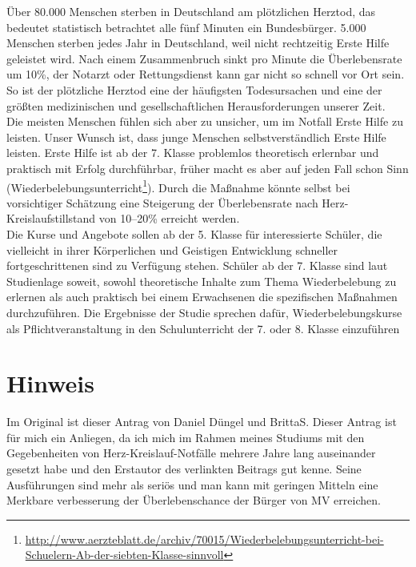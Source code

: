 Über 80.000 Menschen sterben in Deutschland am plötzlichen Herztod, das bedeutet statistisch betrachtet alle fünf Minuten ein Bundesbürger. 5.000 Menschen sterben jedes Jahr in Deutschland, weil nicht rechtzeitig Erste Hilfe geleistet wird. Nach einem Zusammenbruch sinkt pro Minute die Überlebensrate um 10\%, der Notarzt oder Rettungsdienst kann gar nicht so schnell vor Ort sein. So ist der plötzliche Herztod eine der häufigsten Todesursachen und eine der größten medizinischen und gesellschaftlichen Herausforderungen unserer Zeit.\\Die meisten Menschen fühlen sich aber zu unsicher, um im Notfall Erste Hilfe zu leisten. Unser Wunsch ist, dass junge Menschen selbstverständlich Erste Hilfe leisten. Erste Hilfe ist ab der 7. Klasse problemlos theoretisch erlernbar und praktisch mit Erfolg durchführbar, früher macht es aber auf jeden Fall schon Sinn (Wiederbelebungsunterricht\footnote{\url{http://www.aerzteblatt.de/archiv/70015/Wiederbelebungsunterricht-bei-Schuelern-Ab-der-siebten-Klasse-sinnvoll}}). Durch die Maßnahme könnte selbst bei vorsichtiger Schätzung eine Steigerung der Überlebensrate nach Herz-Kreislaufstillstand von 10--20\% erreicht werden.\\Die Kurse und Angebote sollen ab der 5. Klasse für interessierte Schüler, die vielleicht in ihrer Körperlichen und Geistigen Entwicklung schneller fortgeschrittenen sind zu Verfügung stehen. Schüler ab der 7. Klasse sind laut Studienlage soweit, sowohl theoretische Inhalte zum Thema Wiederbelebung zu erlernen als auch praktisch bei einem Erwachsenen die spezifischen Maßnahmen durchzuführen. Die Ergebnisse der Studie sprechen dafür, Wiederbelebungskurse als Pflichtveranstaltung in den Schulunterricht der 7. oder 8. Klasse einzuführen

\section{Hinweis}

Im Original ist dieser Antrag von Daniel Düngel und BrittaS. Dieser Antrag ist für mich ein Anliegen, da ich mich im Rahmen meines Studiums mit den Gegebenheiten von Herz-Kreislauf-Notfälle mehrere Jahre lang auseinander gesetzt habe und den Erstautor des verlinkten Beitrags gut kenne. Seine Ausführungen sind mehr als seriös und man kann mit geringen Mitteln eine Merkbare verbesserung der Überlebenschance der Bürger von MV erreichen.
